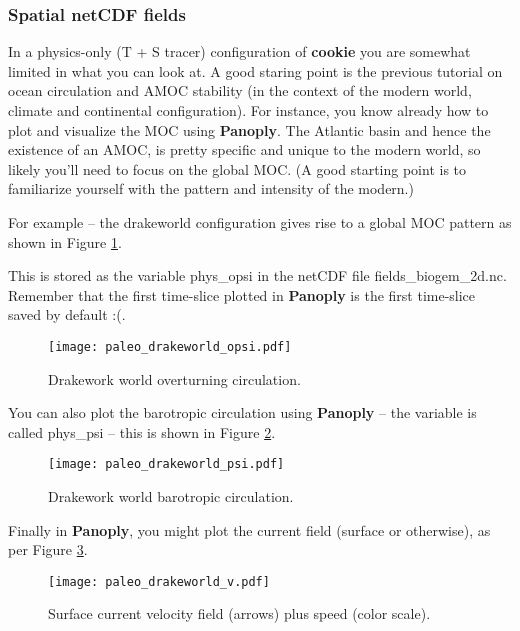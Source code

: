 
\subsubsection{Spatial netCDF fields}

In a physics-only (T + S tracer) configuration of \textbf{cookie} you are  somewhat limited in what you can look at. A good staring point is the previous tutorial on ocean circulation and AMOC stability (in the context of the modern world, climate and continental configuration). For instance, you know already how to plot and visualize the MOC using \textbf{Panoply}. The Atlantic basin and hence the existence of an AMOC, is pretty specific and unique to the modern world, so likely you'll need to focus on the global MOC. (A good starting point is to familiarize yourself with the pattern and intensity of the modern.)

For example -- the \textsf{\footnotesize drakeworld } configuration gives rise to a global MOC pattern as shown in Figure \ref{fig:paleo_drakeworld.opsi}.

This is stored as the variable \textsf{\footnotesize phys\_opsi} in the netCDF file \textsf{\footnotesize fields\_biogem\_2d.nc}. Remember that the first time-slice plotted in \textbf{Panoply} is the first time-slice saved by default :(.

\begin{figure}[H]
\texttt{[image: paleo\_drakeworld\_opsi.pdf]}\centering
\vspace{-0mm}
\caption{Drakework world overturning circulation.}
\label{fig:paleo_drakeworld.opsi}
\end{figure}

You can also plot the barotropic circulation using \textbf{Panoply} -- the variable is called \textsf{\footnotesize phys\_psi} -- this is shown in Figure \ref{fig:paleo_drakeworld.psi}.

\begin{figure}[H]
\texttt{[image: paleo\_drakeworld\_psi.pdf]}\centering
\vspace{-0mm}
\caption{Drakework world barotropic circulation.}
\label{fig:paleo_drakeworld.psi}
\end{figure}

Finally in \textbf{Panoply}, you might plot the current field (surface or otherwise), as per Figure \ref{fig:paleo_drakeworld.v}.

\begin{figure}
\texttt{[image: paleo\_drakeworld\_v.pdf]}\centering
\vspace{-0mm}
\caption{Surface current velocity field (arrows) plus speed (color scale).}
\label{fig:paleo_drakeworld.v}
\end{figure}

